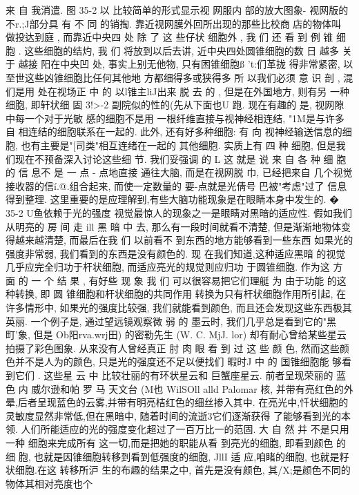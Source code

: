 \documentclass[11pt,oneside]{book}
\begin{document}
\begin{common-format}
来 自 我消遣.
图 35-2 以 比较简单的形式显示视 网服内 部的放大图象- 视网版的不r.;J部分具 有 不 同
的销掏. 靠近视网膜外回所出现的那些比校商
店的物体叫 做投达到庭 , 而靠近中央四 处 除 了
这 些仔状 细胞外 ,
我 们 还 看 到 例 锥 细胞 .
这些细胞的结灼, 我 们 将放到以后去讲,
近中央四处圆锥细胞的数 日 越多
关于
越接
阳在中央凹
处, 事实上别无他物, 只有困锥细胞ß 't:们革拢
得非常紧密, 以至世这些凶锥细胞比任何其他地
方都细得多或狭得多 所 以我们必须 意 识 剖 ,
混们是用 处在视场正 中 的 以l锥主liJ出来 脱 去 的 ,
但是在外国地方, 则有另 一种细胞, 即轩状细
固 3!>-2
副院似的性的(先从下面也U
跑.
现在有趣的 是, 视网隙中每一个对于光敏
感的细胞不是用 一根纤维直接与视神经相连结, "1M是与许多 自 相连结的细胞联系在一起的.
此外, 还有好多种细胞: 有 向 视神经输送信息的细胞, 也有主要是"[司类"相互连绪在一起的
其他细胞. 实质上有 四 种 细胞, 但是我们现在不预备深入讨论这些细 节. 我们妥强调 的 L
这 就是 说 来 自 各 种 细 胞 的 信 息不 是 一 点 - 点地直接
通往大脑, 而是在视网脱 巾, 已经把来自 几个视觉接收器的信í.@.组合起来, 而使一定数量的
要-点就是光倩号 巴被"考虑"过了
信息得到整理. 这里重要的是应理解到,有些大脑功能现象是在眼睛本身中发生的.
� 35-2
U鱼依赖于光的强度
视觉最惊人的现象之一是眼睛对黑暗的适应性. 假如我们从明亮的 房 间 走 ill 黑 暗 中
去, 那么有一段时间就看不清楚, 但是渐渐地物体变得越来越清楚, 而最后在我 们 以前看不
到东西的地方能够看到一些东西 如果光的强度非常弱, 我们看到的东西是没有颜色的. 现
在我们知道,这种适应黑暗 的视觉几乎应完全归功于杆状细胞, 而适应亮光的规觉则应归功
于圆锥细胞.
作为这 方 面 的 一 个 结 果 , 有好些 现 象 我 们 可以很容易把它们理艇 为 由于功能
的这种转换, 即 圆 锥细胞和杆状细胞的共同作用 转换为只有杆状细胞作用所引起,
在许多情形中, 如果光的强度比较强, 我们就能看到颜色, 而且还会发现这些东西极其
英丽. 一个例子是, 通过望远镜观察微 弱 的 墨云时, 我们几乎总是看到它的"黑 町'象, 但是
Ob阳rva.wrj田) 的密勒先生 (W. C. MjJ.
lor) 却有耐心曾给某些星云拍摄了彩色图象. 从来没有人曾经真正 肘 肉 眼 看 到 过 这 些 颜
色, 然而这些颜色并不是人为的颜色, 只是光的强度还不足以便找们 暇时J 中 的 国锥细胞能
够看到它们 . 这些星 云 中 比较壮丽的有环状星云和 巨蟹座星云. 前者呈现荣丽的 蓝 色 内
威尔逊和帕 罗 马 天文台 (M也 WilSOll alld Palomar
核, 并带有亮红色的外晕,后者呈现蓝色的云雾,并带有明亮桔红色的细丝掺入其中.
在亮光中,忏状细胞的灵敏度显然非常低,但在黑暗中, 随着时间的流逝3它们逐渐获得
了能够看到光的本领. 人们所能适应的光的强度变化超过了一百万比一的范固. 大 自 然 并
不是只用一种 细胞来完成所有 这一切,而是把她的职能从看 到亮光的细胞, 即看到颜色 的 细
胞, 也就是因锥细胞转移到看到低强度的细胞, JllI 适 应,咱睹的细胞, 也就是籽状细胞.在这­
转移所沪 生的布趣的结果之中, 首先是没有颜色, 其/X;是颜色不同的物体其相对亮度也个


\end{common-format}
\end{document}
